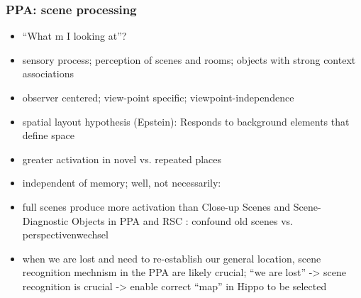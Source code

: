 \documentclass[10pt,a4paper,twocolumn]{article}
\begin{document}
\subsubsection{PPA: scene processing}
\begin{itemize}
	\item ``What m I looking at''?
	\item sensory process; perception of scenes and rooms; objects with strong
	context associations
	\item observer centered; view-point specific; viewpoint-independence
	\item spatial layout hypothesis (Epstein): Responds to background elements
	that define space
	\item greater activation in novel vs. repeated places \citep{epstein_1999_parahippocampal_place_area}
	\item independent of memory; well, not necessarily: \citep{epstein_2007_scene_familar_unfamiliar,epstein_2005_visual_scene_processing}
	\item full scenes produce more activation than Close-up Scenes and Scene-Diagnostic
	Objects in PPA and RSC \citep{henderson_2008_full_scenes_vs_close-ups}:
	confound old scenes vs. perspectivenwechsel
	\item when we are lost and need to re-establish our general location, scene
	recognition mechnism in the PPA are likely crucial; ``we are lost''
	-> scene recognition is crucial -> enable correct ``map'' in Hippo
	to be selected
\end{itemize}
\end{document}
